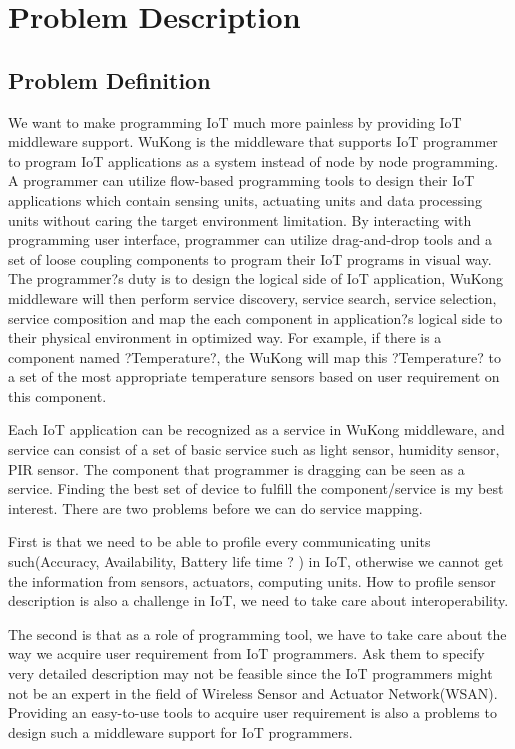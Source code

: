 \chapter{Problem Description}
\label{c:prob_desc}


\section{Problem Definition}
We want to make programming IoT much more painless by providing IoT middleware support. WuKong is the middleware that supports IoT programmer to program IoT applications as a system instead of node by node programming. A programmer can utilize flow-based programming tools to design their IoT applications which contain sensing units, actuating units and data processing units without caring the target environment limitation. By interacting with programming user interface, programmer can utilize drag-and-drop tools and a set of loose coupling components to program their IoT programs in visual way. The programmer?s duty is to design the logical side of IoT application, WuKong middleware will then perform service discovery, service search, service selection, service composition and map the each component in application?s logical side to their physical environment in optimized way. For example, if there is a component named ?Temperature?, the WuKong will map this ?Temperature? to a set of the most appropriate temperature sensors based on user requirement on this component. 

Each IoT application can be recognized as a service in WuKong middleware, and service can consist of a set of basic service such as light sensor, humidity sensor, PIR sensor. The component that programmer is dragging can be seen as a service. Finding the best set of device to fulfill the component/service is my best interest. There are two problems before we can do service mapping. 

First is that we need to be able to profile every communicating units such(Accuracy, Availability, Battery life time ? ) in IoT, otherwise we cannot get the information from sensors, actuators, computing units. How to profile sensor description is also a challenge in IoT, we need to take care about interoperability. 

The second is that as a role of programming tool, we have to take care about the way we acquire user requirement from IoT programmers. Ask them to specify very detailed description may not be feasible since the IoT programmers might not be an expert in the field of Wireless Sensor and Actuator Network(WSAN). Providing an easy-to-use tools to acquire user requirement is also a problems to design such a middleware support for IoT programmers.

